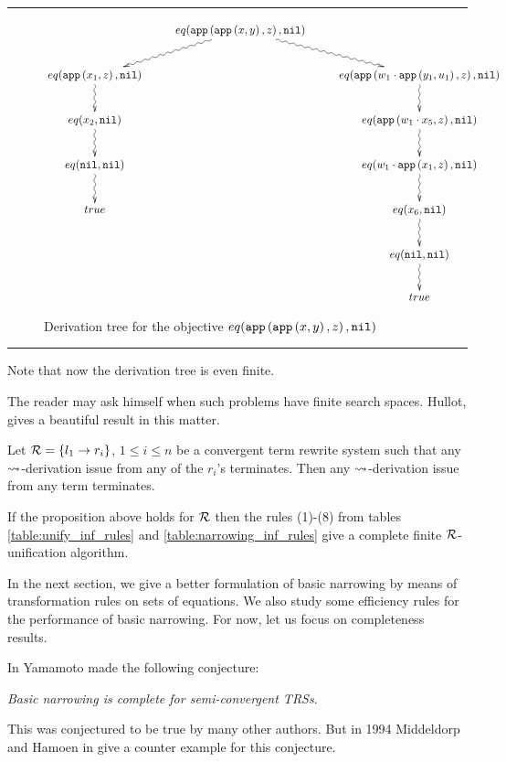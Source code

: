 \begin{landscape}
	\thispagestyle{empty}
	\hrule
	\begin{figure}[!ht]
		\begin{displaymath}
			\xymatrix{
				& eq(\appFunc{\appFunc{x}{y}}{z}, \nilList) \ar@{~>}[dr] \ar@{~>}[dl] \\
				eq(\appFunc{x_1}{z},\nilList) \ar@{~>}[d] & & eq(\appFunc{w_1 \cdot \appFunc{y_1}{u_1}}{z}, \nilList) \ar@{~>}[d]\\
				eq(x_2,\nilList) \ar@{~>}[d] & & eq(\appFunc{w_1 \cdot x_5}{z}, \nilList) \ar@{~>}[d]\\
				eq(\nilList, \nilList) \ar@{~>}[d]& & eq(w_1 \cdot \appFunc{x_1}{z}, \nilList) \ar@{~>}[d]\\
				true & & eq(x_6, \nilList) \ar@{~>}[d]\\
				& & eq(\nilList, \nilList) \ar@{~>}[d]\\
				& & true
			}
		\end{displaymath}
		\caption{Derivation tree for the objective $eq(\mathtt{app}\left(\mathtt{app}\left(x,y\right),z\right), \mathtt{nil})$}
		\label{figure:example:app:derivation-tree-basic-narrowing}
	\end{figure}
	\hrule
	\vspace{1cm}
	Note that now the derivation tree is even finite.
\end{landscape}

The reader may ask himself when such problems have finite search spaces. Hullot, \cite{hullot:cfunif} gives a beautiful result in this matter.

\begin{proposition}
	Let $\mathcal{R} = \{ l_1 \rightarrow r_i \}$, $1 \leq i \leq n$ be a convergent term rewrite system such that any $\mathbin{\rightsquigarrow}$-derivation issue from any of the $r_i$'s terminates. Then any $\mathbin{\rightsquigarrow}$-derivation issue from any term terminates.
\end{proposition}

If the proposition above holds for $\mathcal{R}$ then the rules (1)-(8) from tables \ref{table:unify_inf_rules} and \ref{table:narrowing_inf_rules} give a complete finite $\mathcal{R}$-unification algorithm.

In the next section, we give a better formulation of basic narrowing by means of transformation rules on sets of equations. We also study some efficiency rules for the performance of basic narrowing. For now, let us focus on completeness results.

In \cite{10.1007/3-540-51564-X_51} Yamamoto made the following conjecture:
\begin{center}
    \textit{Basic narrowing is complete for semi-convergent TRSs}.
\end{center}
This was conjectured to be true by many other authors. But in 1994 Middeldorp and Hamoen in \cite{Middeldorp1994} give a counter example for this conjecture.

